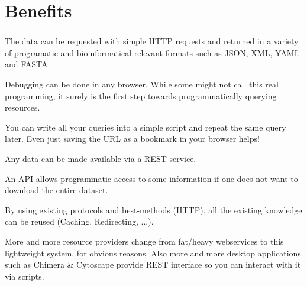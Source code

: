 \documentclass[a4paper,10pt,xcolor=pdftex,dvipsnames,table]{beamer}
\begin{document}
\section{Benefits}
\begin{frame}[t]\frametitle{\insertsection{}}
  \begin{description}[<+->]
   \item[Easy requests] The data can be requested with simple HTTP requests and returned in a variety of programatic and bioinformatical relevant formats such as JSON, XML, YAML and FASTA. 
   \item[Easy debugging] Debugging can be done in any browser. While some might not call this real programming, it surely is the first step towards programmatically querying resources.
   \item[Reproducable] You can write all your queries into a simple script and repeat the same query later. Even just saving the URL as a bookmark in your browser helps!
   \item[Powerful] Any data can be made available via a REST service.
   \item[Bandwidth] An API allows programmatic access to some information if one does not want to download the entire dataset.
   \item[Standards] By using existing protocols and best-methods (HTTP), all the existing knowledge can be reused (Caching, Redirecting, ...).
   \item[Widespread] More and more resource providers change from fat/heavy webservices to this lightweight system, for obvious reasons. Also
       more and more desktop applications such as Chimera \& Cytoscape provide REST interface so you can interact with it via scripts.
  \end{description}
  \vspace{-2mm}%
\end{frame}
\end{document}
